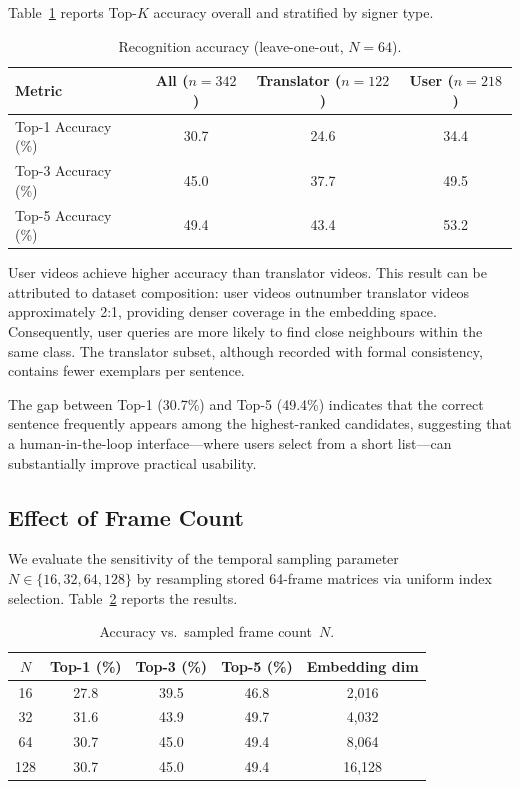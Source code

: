 \documentclass[runningheads]{llncs}
\begin{document}
Table~\ref{tab:accuracy} reports Top-$K$ accuracy overall and
stratified by signer type.

\begin{table}[t]
\centering
\caption{Recognition accuracy (leave-one-out, $N=64$).}
\label{tab:accuracy}
\begin{tabular}{@{}lccc@{}}
\toprule
Metric & All ($n{=}342$) & Translator ($n{=}122$) & User ($n{=}218$) \\
\midrule
Top-1 Accuracy (\%) & 30.7 & 24.6 & 34.4 \\
Top-3 Accuracy (\%) & 45.0 & 37.7 & 49.5 \\
Top-5 Accuracy (\%) & 49.4 & 43.4 & 53.2 \\
\bottomrule
\end{tabular}
\end{table}

User videos achieve higher accuracy than translator videos.
This result can be attributed to dataset composition: user videos
outnumber translator videos approximately 2:1, providing denser
coverage in the embedding space.
Consequently, user queries are more likely to find close neighbours
within the same class.
The translator subset, although recorded with formal consistency,
contains fewer exemplars per sentence.

The gap between Top-1 (30.7\%) and Top-5 (49.4\%) indicates that the
correct sentence frequently appears among the highest-ranked candidates,
suggesting that a human-in-the-loop interface—where users select from a
short list—can substantially improve practical usability.

\subsection{Effect of Frame Count}\label{sec:framecount}

We evaluate the sensitivity of the temporal sampling parameter
$N \in \{16, 32, 64, 128\}$ by resampling stored 64-frame matrices via
uniform index selection.
Table~\ref{tab:frames} reports the results.

\begin{table}[t]
\centering
\caption{Accuracy vs.\ sampled frame count~$N$.}
\label{tab:frames}
\begin{tabular}{@{}ccccc@{}}
\toprule
$N$ & Top-1 (\%) & Top-3 (\%) & Top-5 (\%) & Embedding dim \\
\midrule
16  & 27.8 & 39.5 & 46.8 & 2{,}016 \\
32  & 31.6 & 43.9 & 49.7 & 4{,}032 \\
64  & 30.7 & 45.0 & 49.4 & 8{,}064 \\
128 & 30.7 & 45.0 & 49.4 & 16{,}128 \\
\bottomrule
\end{tabular}
\end{table}
\end{document}
